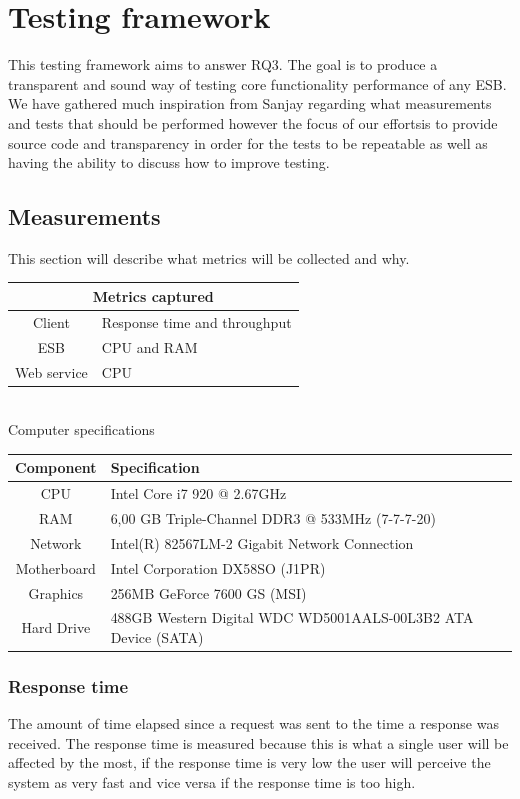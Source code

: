 \section{Testing framework}
This testing framework aims to answer RQ3. The goal is to produce a transparent and sound way of testing core functionality \cite{lit review} performance of any ESB. 
We have gathered much inspiration from Sanjay \cite{Sanjay} regarding what measurements and tests that should be performed however the focus of our effortsis to provide source code and transparency in order for the tests to be repeatable as well as having the ability to discuss how to improve testing.

\subsection{Measurements}
This section will describe what metrics will be collected and why.\\

\begin{tabular}{| c | l |}
	\hline
	\multicolumn{2}{|c|}{Metrics captured} \\
	\hline
	Client & Response time and throughput \\ \hline
	ESB & CPU and RAM \\ \hline
	Web service &  CPU \\ \hline
\end{tabular} \\

Computer specifications \\

\begin{tabular}{| c | l |}
	\hline
	Component & Specification \\ \hline
	CPU & Intel Core i7 920 @ 2.67GHz  \\ \hline
	RAM &  6,00 GB Triple-Channel DDR3 @ 533MHz (7-7-7-20) \\ \hline
	Network &  Intel(R) 82567LM-2 Gigabit Network Connection \\ \hline
	Motherboard &  Intel Corporation DX58SO (J1PR) \\ \hline
	Graphics &  256MB GeForce 7600 GS (MSI) \\ \hline
	Hard Drive &  488GB Western Digital WDC WD5001AALS-00L3B2 ATA Device (SATA) \\ \hline
\end{tabular} 
\subsubsection{Response time}
The amount of time elapsed since a request was sent to the time a response was received. 
The response time is measured because this is what a single user will be affected by the most, if the response time is very low the user will perceive the system as very fast and vice versa if the response time is too high.
